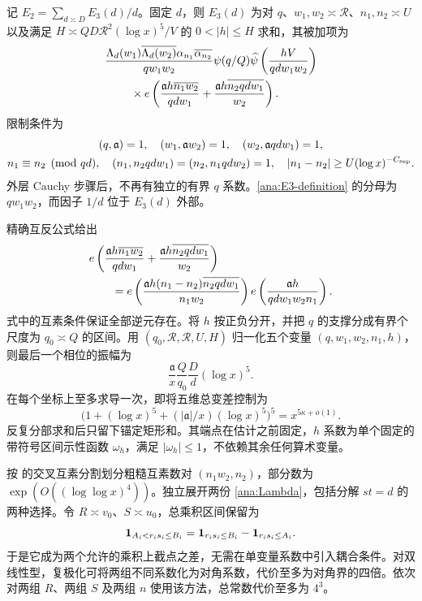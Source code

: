 记 $E_2=\sum_{d\asymp D}E_3(d)/d$。固定 $d$，则 $E_3(d)$ 为对 $q$、$w_1,w_2\asymp\mathcal R$、$n_1,n_2\asymp U$ 以及满足 $H\asymp QD\mathcal R^2(\log x)^5/V$ 的 $0<|h|\le H$ 求和，其被加项为
\begin{align}
 &\frac{\Lambda_d(w_1)\overline{\Lambda_d(w_2)}
               \alpha_{n_1}\overline{\alpha_{n_2}}}{qw_1w_2}
 \psi(q/Q)\widehat\psi\left(\frac{hV}{qdw_1w_2}\right)\notag\\
 &\hspace{8mm}\times
 e\left(\frac{\mathfrak{a}h\overline{n_1w_2}}{qdw_1}
          +\frac{\mathfrak{a}h\overline{n_2qdw_1}}{w_2}\right).
 \label{ana:E3-definition}
\end{align}
限制条件为
\[
 \begin{gathered}
 (q,\mathfrak{a})=1,\quad(w_1,\mathfrak{a}w_2)=1,\quad(w_2,\mathfrak{a}qdw_1)=1,\\
 n_1\equiv n_2\pmod{qd},\quad
 (n_1,n_2qdw_1)=(n_2,n_1qdw_2)=1,\quad
 |n_1-n_2|\ge U(\log x)^{-C_{\rm sep}}.
 \end{gathered}
\]
外层 Cauchy 步骤后，不再有独立的有界 $q$ 系数。\eqref{ana:E3-definition} 的分母为 $qw_1w_2$，而因子 $1/d$ 位于 $E_3(d)$ 外部。

精确互反公式给出
\begin{align}
 &e\left(\frac{\mathfrak{a}h\overline{n_1w_2}}{qdw_1}
          +\frac{\mathfrak{a}h\overline{n_2qdw_1}}{w_2}\right)\notag\\
 &\qquad=
 e\left(\frac{\mathfrak{a}h(n_1-n_2)\overline{n_2qdw_1}}{n_1w_2}\right)
 e\left(\frac{\mathfrak{a}h}{qdw_1w_2n_1}\right).
 \label{eq:current-retained-phase}
\end{align}
式中的互素条件保证全部逆元存在。将 $h$ 按正负分开，并把 $q$ 的支撑分成有界个尺度为 $q_0\asymp Q$ 的区间。用 $(q_0,\mathcal R,\mathcal R,U,H)$ 归一化五个变量 $(q,w_1,w_2,n_1,h)$，则最后一个相位的振幅为
\[
 \frac{\mathfrak{a}}{x}\frac Q{q_0}\frac Dd(\log x)^5.
\]
在每个坐标上至多求导一次，即将五维总变差控制为
\begin{equation}
 \bigl(1+(\log x)^5+(|\mathfrak{a}|/x)(\log x)^5\bigr)^5
       =x^{5\kappa+o(1)}.
 \label{ana:phase-variation}
\end{equation}
反复分部求和后只留下锚定矩形和。其端点在估计之前固定，$h$ 系数为单个固定的带符号区间示性函数 $\omega_h$，满足 $|\omega_h|\le1$，不依赖其余任何算术变量。

按 \cite[Lemma 13.2]{MaynardI} 的交叉互素分割划分粗糙互素数对 $(n_1w_2,n_2)$，部分数为 $\exp(O((\log\log x)^4))$。独立展开两份 \eqref{ana:Lambda}，包括分解 $st=d$ 的两种选择。令 $R\asymp v_0$、$S\asymp u_0$，总乘积区间保留为
\[
 \mathbf 1_{A_i<r_is_i\le B_i}
       =\mathbf 1_{r_is_i\le B_i}-\mathbf 1_{r_is_i\le A_i}.
\]
于是它成为两个允许的乘积上截点之差，无需在单变量系数中引入耦合条件。对双线性型，复极化可将两组不同系数化为对角系数，代价至多为对角界的四倍。依次对两组 $R$、两组 $S$ 及两组 $n$ 使用该方法，总常数代价至多为 $4^3$。

